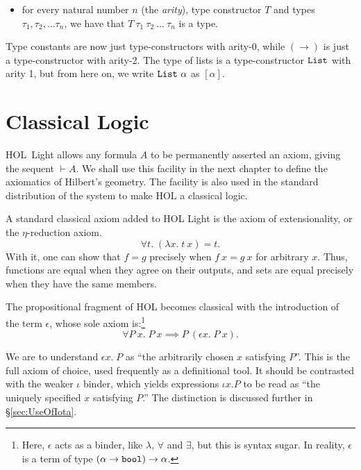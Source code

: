 \begin{itemize}
\item[] for every natural number $n$ (the \emph{arity}), type constructor $T$ and types $\tau_1, \tau_2, \ldots \tau_n$, we have that $T\ \tau_1\ \tau_2\ \ldots\ \tau_n$ is a type.
\end{itemize}

Type constants are now just type-constructors with arity-0, while $(\rightarrow)$ is just a type-constructor with arity-2. The type of lists is a type-constructor $\texttt{List}$ with arity 1, but from here on, we write $\texttt{List}\ \alpha$ as $[\alpha]$.

\section{Classical Logic}\label{sec:ClassicalAxioms}
HOL~Light allows any formula $A$ to be permanently asserted an axiom, giving the sequent $\vdash A$. We shall use this facility in the next chapter to define the axiomatics of Hilbert's geometry. The facility is also used in the standard distribution of the system to make HOL a classical logic.

A standard classical axiom added to HOL Light is the axiom of extensionality, or the $\eta$-reduction axiom. 
\begin{displaymath}
\forall t.\; (\lambda x.\; t\ x) = t.
\end{displaymath}
With it, one can show that $f = g$ precisely when $f\ x = g\ x$ for arbitrary $x$. Thus, functions are equal when they agree on their outputs, and sets are equal precisely when they have the same members.

The propositional fragment of HOL becomes classical with the introduction of the term $\epsilon$, whose sole axiom is:\footnote{Here, $\epsilon$ acts as a binder, like $\lambda$, $\forall$ and $\exists$, but this is syntax sugar. In reality, $\epsilon$ is a term of type $(\alpha \rightarrow \texttt{bool}) \rightarrow \alpha$.}
\begin{displaymath}
\forall P\ x.\; P\ x \implies P\ (\epsilon x.\; P\ x).
\end{displaymath}

We are to understand $\epsilon x.\; P$ as ``the arbitrarily chosen $x$ satisfying $P$''. This is the full axiom of choice, used frequently as a definitional tool. It should be contrasted with the weaker $\iota$ binder, which yields expressions $\iota x. P$ to be read as ``the uniquely specified $x$ satisfying $P$.'' The distinction is discussed further in \S\ref{sec:UseOfIota}.

